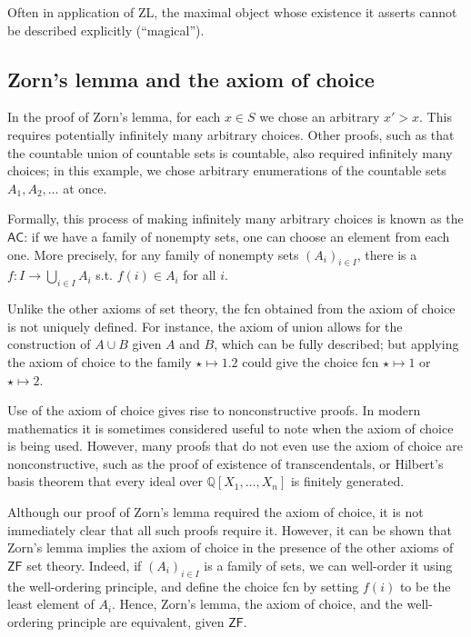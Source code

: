 \begin{remark}
    Often in application of ZL, the maximal object whose existence it asserts cannot be described explicitly (``magical'').
\end{remark}

\subsection{Zorn's lemma and the axiom of choice}
In the proof of Zorn's lemma, for each $x \in S$ we chose an arbitrary $x' > x$.
This requires potentially infinitely many arbitrary choices.
Other proofs, such as that the countable union of countable sets is countable, also required infinitely many choices; in this example, we chose arbitrary enumerations of the countable sets $A_1, A_2, \dots$ at once.

Formally, this process of making infinitely many arbitrary choices is known as the  $\mathsf{AC}$: if we have a family of nonempty sets, one can choose an element from each one.
More precisely, for any family of nonempty sets $(A_i)_{i \in I}$, there is a  $f \colon I \to \bigcup_{i \in I} A_i$ s.t. $f(i) \in A_i$ for all $i$.

Unlike the other axioms of set theory, the fcn obtained from the axiom of choice is not uniquely defined.
For instance, the axiom of union allows for the construction of $A \cup B$ given $A$ and $B$, which can be fully described; but applying the axiom of choice to the family $\star \mapsto \qty{1, 2}$ could give the choice fcn $\star \mapsto 1$ or $\star \mapsto 2$.

Use of the axiom of choice gives rise to nonconstructive proofs.
In modern mathematics it is sometimes considered useful to note when the axiom of choice is being used.
However, many proofs that do not even use the axiom of choice are nonconstructive, such as the proof of existence of transcendentals, or Hilbert's basis theorem that every ideal over $\mathbb Q[X_1, \dots, X_n]$ is finitely generated.

Although our proof of Zorn's lemma required the axiom of choice, it is not immediately clear that all such proofs require it.
However, it can be shown that Zorn's lemma implies the axiom of choice in the presence of the other axioms of $\mathsf{ZF}$ set theory.
Indeed, if $(A_i)_{i \in I}$ is a family of sets, we can well-order it using the well-ordering principle, and define the choice fcn by setting $f(i)$ to be the least element of $A_i$.
Hence, Zorn's lemma, the axiom of choice, and the well-ordering principle are equivalent, given $\mathsf{ZF}$.

